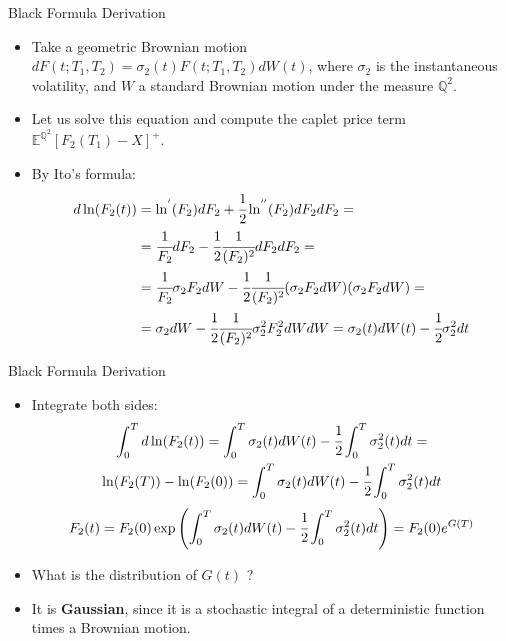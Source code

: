 \documentclass{beamer}
\begin{document}
\begin{frame}{Black Formula Derivation}
\begin{itemize}
\item Take a geometric Brownian motion $dF(t; T_1, T_2) = \sigma_2(t) F(t; T_1, T_2)dW(t)$, where $\sigma_2$ is the instantaneous volatility, and $W$ a standard Brownian motion under the measure $\mathbb{Q}^2$.
\item Let us solve this equation and compute the caplet price term $\mathbb{E}^{\mathbb{Q}^2}[F_2(T_1) - X]^+$.
\item By Ito’s formula:
\begin{equation*}
\begin{aligned}
d\ln(F_2(t)) &= \ln^{'}(F_2)dF_2 + \cfrac{1}{2} \ln^{''}(F_2) dF_2 dF_2 =\\
&=\cfrac{1}{F_2}dF_2 - \cfrac{1}{2}\cfrac{1}{(F_2)^2} dF_2 dF_2 = \\
&=\cfrac{1}{F_2}\sigma_2 F_2dW - \cfrac{1}{2}\cfrac{1}{(F_2)^2}  (\sigma_2 F_2 dW)(\sigma_2 F_2 dW) = \\
&= \sigma_2 dW - \cfrac{1}{2}\cfrac{1}{(F_2)^2}\sigma^2_2 F^2_2 dWdW = \sigma_2(t) dW(t) - \cfrac{1}{2}\sigma^2_2 dt
\end{aligned}
\end{equation*}
\end{itemize}
\end{frame}

\begin{frame}{Black Formula Derivation}
\begin{itemize}
\item Integrate both sides:
\begin{equation*}
\begin{gathered}
\int_0^T d \ln(F_2(t)) = \int_0^T \sigma_2(t)dW(t) - \cfrac{1}{2}\int_0^T  \sigma^2_2(t)dt = \\
\ln(F_2(T)) - \ln(F_2(0)) = \int_0^T \sigma_2(t)dW(t) - \cfrac{1}{2}\int_0^T \sigma^2_2(t)dt \\
\end{gathered}
\end{equation*}
\begin{equation*}
F_2(t) = F_2(0)\exp\left(\int_0^T \sigma_2(t)dW(t) - \cfrac{1}{2}\int_0^T  \sigma^2_2(t)dt\right) = F_2(0)e^{G(T)} 
\end{equation*}
\item<2-> What is the distribution of $G(t)$ ?
\item<3-> It is \textbf{Gaussian}, since it is a stochastic integral of a deterministic function times a Brownian motion.
\end{itemize}
\end{frame}
\end{document}

